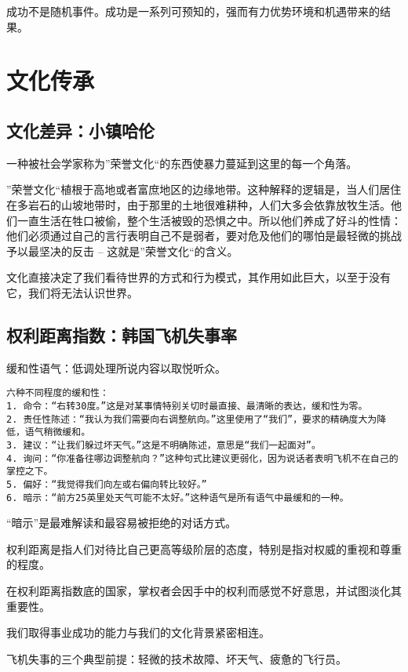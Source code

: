 \documentclass{ctexbook}
\begin{document}
成功不是随机事件。成功是一系列可预知的，强而有力优势环境和机遇带来的结果。


\part{文化传承}

\chapter{文化差异：小镇哈伦}

一种被社会学家称为”荣誉文化“的东西使暴力蔓延到这里的每一个角落。

”荣誉文化“植根于高地或者富庶地区的边缘地带。这种解释的逻辑是，当人们居住在多岩石的山坡地带时，由于那里的土地很难耕种，人们大多会依靠放牧生活。他们一直生活在牲口被偷，整个生活被毁的恐惧之中。所以他们养成了好斗的性情：他们必须通过自己的言行表明自己不是弱者，要对危及他们的哪怕是最轻微的挑战予以最坚决的反击 -- 这就是”荣誉文化“的含义。

文化直接决定了我们看待世界的方式和行为模式，其作用如此巨大，以至于没有它，我们将无法认识世界。


\chapter{权利距离指数：韩国飞机失事率}

缓和性语气：低调处理所说内容以取悦听众。

\begin{verbatim}
六种不同程度的缓和性：
1. 命令：“右转30度。”这是对某事情特别关切时最直接、最清晰的表达，缓和性为零。
2. 责任性陈述：“我认为我们需要向右调整航向。”这里使用了“我们”，要求的精确度大为降低，语气稍微缓和。
3. 建议：“让我们躲过坏天气。”这是不明确陈述，意思是“我们一起面对”。
4. 询问：“你准备往哪边调整航向？”这种句式比建议更弱化，因为说话者表明飞机不在自己的掌控之下。
5. 偏好：“我觉得我们向左或右偏向转比较好。”
6. 暗示：“前方25英里处天气可能不太好。”这种语气是所有语气中最缓和的一种。
\end{verbatim}


“暗示”是最难解读和最容易被拒绝的对话方式。


权利距离是指人们对待比自己更高等级阶层的态度，特别是指对权威的重视和尊重的程度。

在权利距离指数底的国家，掌权者会因手中的权利而感觉不好意思，并试图淡化其重要性。

我们取得事业成功的能力与我们的文化背景紧密相连。

飞机失事的三个典型前提：轻微的技术故障、坏天气、疲惫的飞行员。
\end{document}
